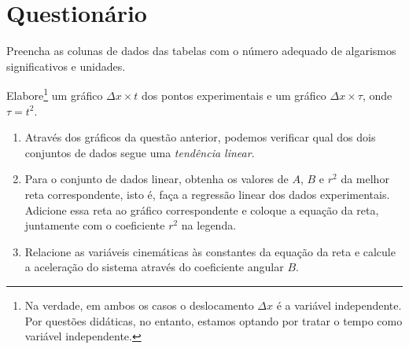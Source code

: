 \begin{fullwidth}
\noindent{}
\vspace{5mm}

\noindent{}

\noindent{}

\noindent{}

\noindent{}

\noindent{}
\end{fullwidth}

\vspace{5mm}

\section{Questionário}

\begin{question}[type={exam}]{2}
Preencha as colunas de dados das tabelas com o número adequado de algarismos significativos e unidades.
\end{question}

\begin{question}[type={exam}]{2}
Elabore\footnote{Na verdade, em ambos os casos o deslocamento $\Delta x$ é a variável independente. Por questões didáticas, no entanto, estamos optando por tratar o tempo como variável independente.} um gráfico $\Delta x \times t$ dos pontos experimentais e um gráfico $\Delta x \times \tau$, onde $\tau = t^2$.
\end{question}

\begin{question}[type={exam}]{4}
\begin{enumerate}[label=\roman*.]
\item Através dos gráficos da questão anterior, podemos verificar qual dos dois conjuntos de dados segue uma \emph{tendência linear}.
\item Para o conjunto de dados linear, obtenha os valores de $A$, $B$ e $r^2$ da melhor reta correspondente, isto é, faça a regressão linear dos dados experimentais. Adicione essa reta ao gráfico correspondente e coloque a equação da reta, juntamente com o coeficiente $r^2$ na legenda.
\item Relacione as variáveis cinemáticas às constantes da equação da reta e calcule a aceleração do sistema através do coeficiente angular $B$.
\end{enumerate}
\end{question}

